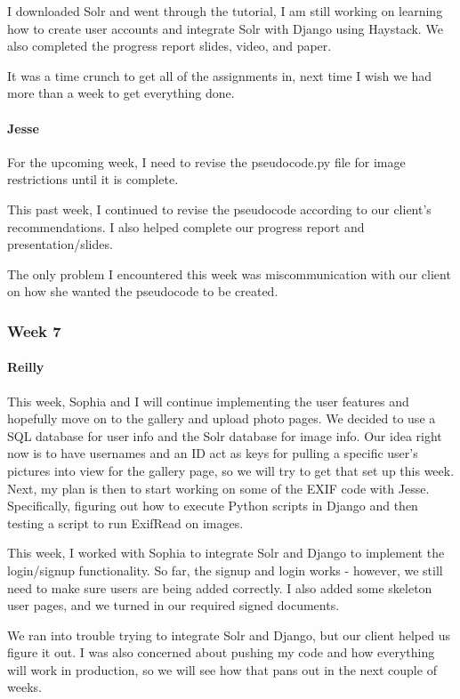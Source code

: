 \documentclass[onecolumn, draftclsnofoot,10pt, compsoc]{IEEEtran}
\begin{document}
\begin{flushleft}
 
I downloaded Solr and went through the tutorial, I am still working on learning how to create user accounts and integrate Solr with Django using Haystack. We also completed the progress report slides, video, and paper.
 
 
It was a time crunch to get all of the assignments in, next time I wish we had more than a week to get everything done.
 
\paragraph{Jesse}
 
For the upcoming week, I need to revise the pseudocode.py file for image restrictions until it is complete.
 
 
This past week, I continued to revise the pseudocode according to our client's recommendations. I also helped complete our progress report and presentation/slides.
 
 
The only problem I encountered this week was miscommunication with our client on how she wanted the pseudocode to be created.
 
\subsubsection{Week 7}
\paragraph{Reilly}
 
This week, Sophia and I will continue implementing the user features and hopefully move on to the gallery and upload photo pages. We decided to use a SQL database for user info and the Solr database for image info. Our idea right now is to have usernames and an ID act as keys for pulling a specific user's pictures into view for the gallery page, so we will try to get that set up this week. Next, my plan is then to start working on some of the EXIF code with Jesse. Specifically, figuring out how to execute Python scripts in Django and then testing a script to run ExifRead on images.
 
 
This week, I worked with Sophia to integrate Solr and Django to implement the login/signup functionality. So far, the signup and login works - however, we still need to make sure users are being added correctly. I also added some skeleton user pages, and we turned in our required signed documents.
 
 
We ran into trouble trying to integrate Solr and Django, but our client helped us figure it out. I was also concerned about pushing my code and how everything will work in production, so we will see how that pans out in the next couple of weeks.
 

\end{flushleft}
\end{document}
